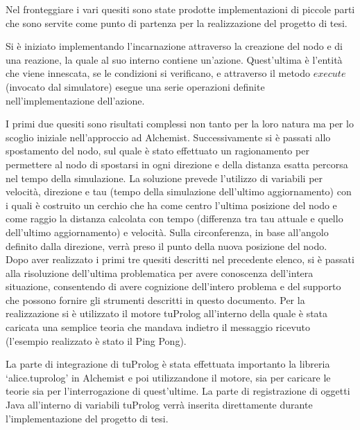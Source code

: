 Nel fronteggiare i vari quesiti sono state prodotte implementazioni di piccole parti che sono servite come punto di partenza per la realizzazione del progetto di tesi.

Si è iniziato implementando l'incarnazione attraverso la creazione del nodo e di una reazione, la quale al suo interno contiene un'azione. Quest'ultima è l'entità che viene innescata, se le condizioni si verificano, e attraverso il metodo $execute$ (invocato dal simulatore) esegue una serie operazioni definite nell'implementazione dell'azione.

I primi due quesiti sono risultati complessi non tanto per la loro natura ma per lo scoglio iniziale nell'approccio ad Alchemist. Successivamente si è passati allo spostamento del nodo, sul quale è stato effettuato un ragionamento per permettere al nodo di spostarsi in ogni direzione e della distanza esatta percorsa nel tempo della simulazione. La soluzione prevede l'utilizzo di variabili per velocità, direzione e tau (tempo della simulazione dell'ultimo aggiornamento) con i quali è costruito un cerchio che ha come centro l'ultima posizione del nodo e come raggio la distanza calcolata con tempo (differenza tra tau attuale e quello dell'ultimo aggiornamento) e velocità. Sulla circonferenza, in base all'angolo definito dalla direzione, verrà preso il punto della nuova posizione del nodo.
\\
Dopo aver realizzato i primi tre quesiti descritti nel precedente elenco, si è passati alla risoluzione dell'ultima problematica per avere conoscenza dell'intera situazione, consentendo di avere cognizione dell'intero problema e del supporto che possono fornire gli strumenti descritti in questo documento. Per la realizzazione si è utilizzato il motore tuProlog all'interno della quale è stata caricata una semplice teoria che mandava indietro il messaggio ricevuto (l'esempio realizzato è stato il Ping Pong).

La parte di integrazione di tuProlog è stata effettuata importanto la libreria `alice.tuprolog' in Alchemist e poi utilizzandone il motore, sia per caricare le teorie sia per l'interrogazione di quest'ultime.
La parte di registrazione di oggetti Java all'interno di variabili tuProlog verrà inserita direttamente durante l'implementazione del progetto di tesi.

